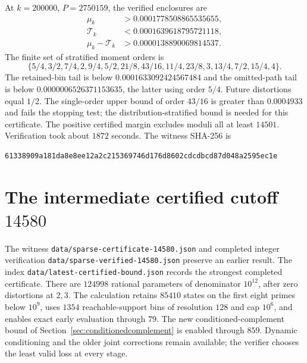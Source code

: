 \documentclass[11pt]{article}
\begin{document}
At $k=200000$, $P=2750159$, the verified enclosures are
\begin{align*}
 \mu_k&>0.0001778508865535655,\\
 \mathcal T_k&<0.0001639618795721118,\\
 \mu_k-\mathcal T_k&>0.0000138890069814537.
\end{align*}
The finite set of stratified moment orders is
\[
 \{5/4,3/2,7/4,2,9/4,5/2,21/8,43/16,11/4,23/8,3,13/4,7/2,15/4,4\}.
\]
The retained-bin tail is below $0.0001633092424567484$ and the
omitted-path tail is below $0.0000006526371153635$, the latter using
order $5/4$. Future distortions equal $1/2$. The single-order upper bound
of order $43/16$ is greater than $0.0004933$ and fails the stopping test;
the distribution-stratified bound is needed for this certificate.
The positive certified margin excludes moduli all at least $14501$.
Verification took about $1872$ seconds. The witness SHA-256 is
\begin{lstlisting}[basicstyle=\ttfamily\scriptsize,breaklines=true]
61338909a181da8e8ee12a2c215369746d176d8602cdcdbcd87d048a2595ec1e
\end{lstlisting}

\section{The intermediate certified cutoff $14580$}\label{sec:14580}
The witness \texttt{data/sparse-certificate-14580.json} and completed
integer verification \texttt{data/sparse-verified-14580.json} preserve an
earlier result. The index \texttt{data/latest-certified-bound.json}
records the strongest completed certificate. There are $124998$ rational
parameters of denominator $10^{12}$, after zero distortions at $2,3$.
The calculation retains $85410$ states on the first eight primes below
$10^9$, uses $1354$ reachable-support bins of resolution $128$ and cap
$10^6$, and enables exact early evaluation through $79$.
The new conditioned-complement bound of
Section~\ref{sec:conditionedcomplement} is enabled through $859$.
Dynamic conditioning and the older joint corrections remain available;
the verifier chooses the least valid loss at every stage.
\end{document}
